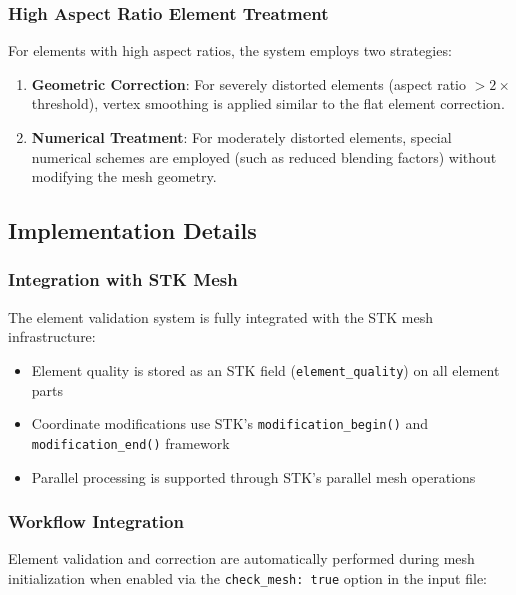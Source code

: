 \documentclass[12pt]{extarticle}
\newcommand{\<}{\langle}
\renewcommand{\>}{\rangle}
\theoremstyle{definition}
\begin{document}
\subsubsection{High Aspect Ratio Element Treatment}

For elements with high aspect ratios, the system employs two strategies:

\begin{enumerate}
    \item \textbf{Geometric Correction}: For severely distorted elements (aspect ratio $> 2 \times$ threshold), vertex smoothing is applied similar to the flat element correction.
    
    \item \textbf{Numerical Treatment}: For moderately distorted elements, special numerical schemes are employed (such as reduced blending factors) without modifying the mesh geometry.
\end{enumerate}

\subsection{Implementation Details}

\subsubsection{Integration with STK Mesh}

The element validation system is fully integrated with the STK mesh infrastructure:

\begin{itemize}
    \item Element quality is stored as an STK field (\texttt{element\_quality}) on all element parts
    \item Coordinate modifications use STK's \texttt{modification\_begin()} and \texttt{modification\_end()} framework
    \item Parallel processing is supported through STK's parallel mesh operations
\end{itemize}

\subsubsection{Workflow Integration}

Element validation and correction are automatically performed during mesh initialization when enabled via the \texttt{check\_mesh: true} option in the input file:
\end{document}
